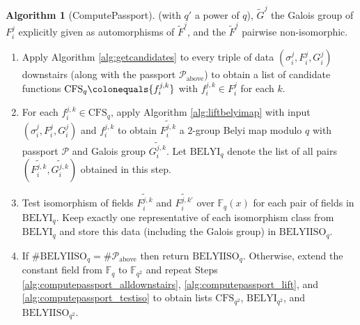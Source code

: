 \documentclass{dcthesis}
\newcommand{\wt}[1]{\widetilde{#1}}
\newcommand{\FF}{\mathbb{F}}
\numberwithin{equation}{section}
\theoremstyle{definition}
\newtheorem{alg}[equation]{Algorithm}
\theoremstyle{remark}
\begin{document}
{{{\begin{alg}[ComputePassport]
      (with $q'$ a power of $q$),
      $\wt{G}^j$
      the Galois group
      of $F_i^j$
      explicitly given
      as automorphisms of $\wt{F}^j$,
      and the $\wt{F}^j$ pairwise
      non-isomorphic.
      \begin{enumerate}
        \item
          \label{alg:computepassport_alldownstairs}
          Apply Algorithm
          \ref{alg:getcandidates}
          to every triple of data
          $(\sigma_i^j,F_i^j,G_i^j)$
          downstairs
          (along with the passport
          $\mathcal{P}_\text{above}$)
          to obtain a list of candidate functions
          $\mathrm{CFS}_q
          \colonequals\{f_i^{j,k}\}$ with
          $f_i^{j,k}\in F_i^j$ for each $k$.
        \item
          \label{alg:computepassport_lift}
          For each $f_i^{j,k}\in\mathrm{CFS}_q$,
          apply Algorithm
          \ref{alg:liftbelyimap}
          with input
          $(\sigma_i^j,F_i^j,G_i^j)$
          and $f_i^{j,k}$
          to obtain
          $\wt{F_i^{j,k}}$ a $2$-group
          Belyi map modulo $q$ with
          passport $\mathcal{P}$ and
          Galois group
          $\wt{G_i^{j,k}}$.
          Let $\mathrm{BELYI}_q$
          denote the list of
          all pairs
          $(\wt{F_i^{j,k}}, \wt{G_i^{j,k}})$
          obtained in this step.
        \item
          \label{alg:computepassport_testiso}
          Test isomorphism of fields
          $\wt{F_i^{j,k}}$
          and $\wt{F_i^{j,k'}}$
          over $\FF_q(x)$
          for each pair of fields
          in $\mathrm{BELYI}_q$.
          Keep exactly one
          representative of each isomorphism
          class from $\mathrm{BELYI}_q$
          and store this data
          (including the Galois group)
          in $\mathrm{BELYIISO}_q$.
        \item
          If $\#\mathrm{BELYIISO}_q=
          \#\mathcal{P}_\text{above}$
          then return
          $\mathrm{BELYIISO}_q$.
          Otherwise,
          extend the constant field
          from $\FF_q$ to $\FF_{q^2}$
          and repeat Steps
          \ref{alg:computepassport_alldownstairs},
          \ref{alg:computepassport_lift},
          and
          \ref{alg:computepassport_testiso}
          to obtain lists
          $\mathrm{CFS}_{q^2}$,
          $\mathrm{BELYI}_{q^2}$,
          and
          $\mathrm{BELYIISO}_{q^2}$.

\end{enumerate}
\end{alg}}}}
\end{document}
